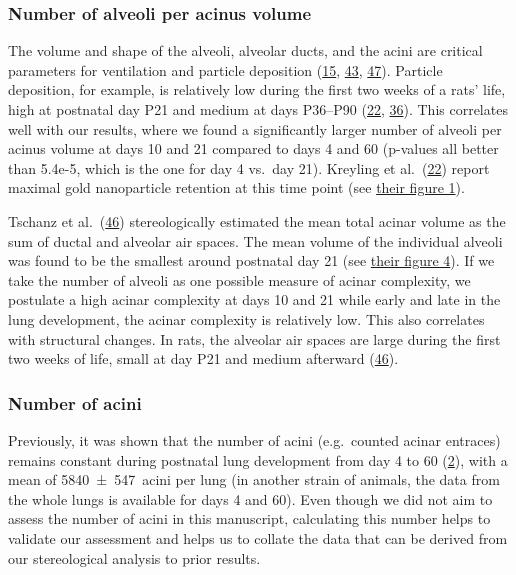 \documentclass[
  american,
]{article}
\begin{document}
\hypertarget{number-of-alveoli-per-acinus-volume}{%
\subsubsection{Number of alveoli per acinus volume}\label{number-of-alveoli-per-acinus-volume}}

The volume and shape of the alveoli, alveolar ducts, and the acini are critical parameters for ventilation and particle deposition (\protect\hyperlink{ref-1HOyVjqpM}{15}, \protect\hyperlink{ref-eioib1TQ}{43}, \protect\hyperlink{ref-OT4s1CSX}{47}).
Particle deposition, for example, is relatively low during the first two weeks of a rats' life, high at postnatal day P21 and medium at days P36--P90 (\protect\hyperlink{ref-18DcNLAv6}{22}, \protect\hyperlink{ref-yHHhvOtP}{36}).
This correlates well with our results, where we found a significantly larger number of alveoli per acinus volume at days 10 and 21 compared to days 4 and 60 (p-values all better than 5.4e-5, which is the one for day 4 vs.~day 21).
Kreyling et al.~(\protect\hyperlink{ref-18DcNLAv6}{22}) report maximal gold nanoparticle retention at this time point (see \href{https://pubs.acs.org/doi/10.1021/acsnano.8b01826\#fig1}{their figure 1}).

Tschanz et al.~(\protect\hyperlink{ref-wnl86DEM}{46}) stereologically estimated the mean total acinar volume as the sum of ductal and alveolar air spaces.
The mean volume of the individual alveoli was found to be the smallest around postnatal day 21 (see \href{https://www.physiology.org/na101/home/literatum/publisher/physio/journals/content/jappl/2014/jappl.2014.117.issue-1/japplphysiol.01355.2013/production/images/medium/zdg0121410620004.jpeg}{their figure 4}).
If we take the number of alveoli as one possible measure of acinar complexity, we postulate a high acinar complexity at days 10 and 21 while early and late in the lung development, the acinar complexity is relatively low.
This also correlates with structural changes.
In rats, the alveolar air spaces are large during the first two weeks of life, small at day P21 and medium afterward (\protect\hyperlink{ref-wnl86DEM}{46}).

\hypertarget{number-of-acini-1}{%
\subsubsection{Number of acini}\label{number-of-acini-1}}

Previously, it was shown that the number of acini (e.g.~counted acinar entraces) remains constant during postnatal lung development from day 4 to 60 (\protect\hyperlink{ref-14OP85b2F}{2}), with a mean of 5840~±~547~acini per lung (in another strain of animals, the data from the whole lungs is available for days 4 and 60).
Even though we did not aim to assess the number of acini in this manuscript, calculating this number helps to validate our assessment and helps us to collate the data that can be derived from our stereological analysis to prior results.
\end{document}
